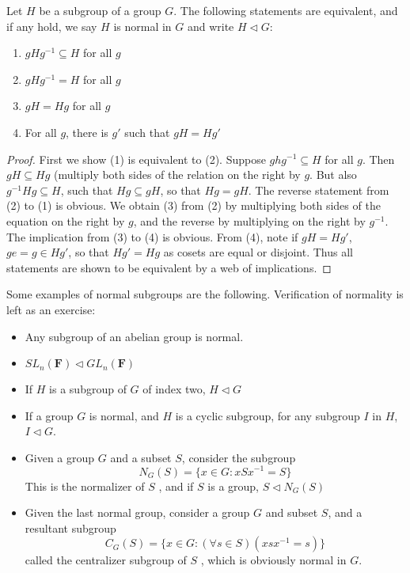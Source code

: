 \begin{theorem}
Let $H$ be a subgroup of a group $G$. The following statements are equivalent, and if any hold, we say $H$ is normal in $G$  and write $H \lhd G$:
\begin{enumerate}
    \item $gHg^{-1} \subseteq H$ for all $g$
    \item $gHg^{-1} = H$ for all $g$
    \item $gH = Hg$ for all $g$
    \item For all $g$, there is $g'$ such that $gH = Hg'$
\end{enumerate}
\end{theorem}
\begin{proof}
    First we show (1) is equivalent to (2). Suppose $ghg^{-1} \subseteq H$ for all $g$. Then $gH \subseteq Hg$ (multiply both sides of the relation on the right by $g$. But also $g^{-1}Hg \subseteq H$, such that $Hg \subseteq gH$, so that $Hg = gH$. The reverse statement from (2) to (1) is obvious. We obtain (3) from (2) by multiplying both sides of the equation on the right by $g$, and the reverse by multiplying on the right by $g^{-1}$. The implication from (3) to (4) is obvious. From (4), note if $gH = Hg'$, $ge = g \in Hg'$, so that $Hg' = Hg$ as cosets are equal or disjoint. Thus all statements are shown to be equivalent by a web of implications.
\end{proof}

Some examples of normal subgroups are the following. Verification of normality is left as an exercise:
\begin{itemize}
    \item Any subgroup of an abelian group is normal.
    \item $SL_n(\mathbf{F}) \lhd GL_n(\mathbf{F})$
    \item If $H$ is a subgroup of $G$ of index two, $H \lhd G$
    \item If a group $G$ is normal, and $H$ is a cyclic subgroup, for any subgroup $I$ in $H$, $I \lhd G$.
    \item Given a group $G$ and a subset $S$, consider the subgroup
    \[ N_G(S) = \{ x \in G : xSx^{-1} = S \} \]
    This is the normalizer of $S$ , and if $S$ is a group, $S \lhd N_G(S)$
    \item Given the last normal group, consider a group $G$ and subset $S$, and a resultant subgroup
    \[ C_G(S) = \{ x \in G : (\forall s \in S)(xsx^{-1} = s) \} \]
    called the centralizer subgroup of $S$ , which is obviously normal in $G$.
\end{itemize}

